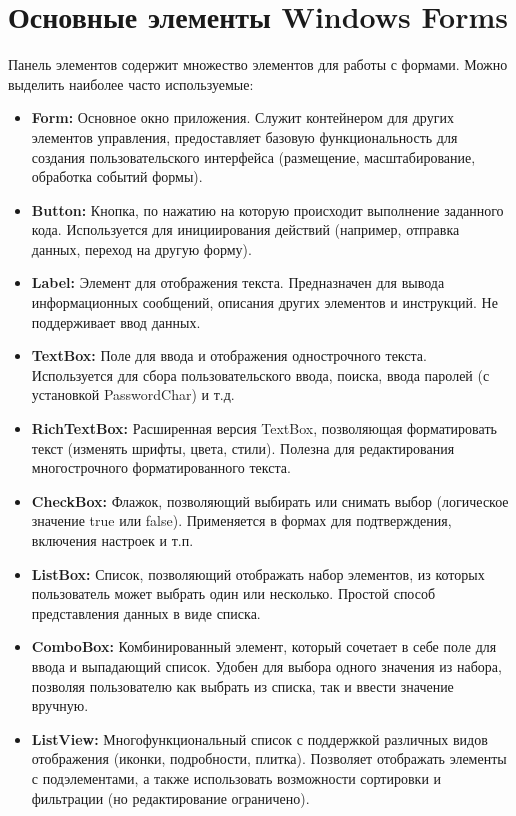 \documentclass[12pt]{article}
\renewcommand{\texttt}[1]{{\small\ttfamily #1}}
\numberwithin{listing}{section}
\numberwithin{figure}{section}
\begin{document}
\newpage

\section{Основные элементы Windows Forms}
Панель элементов содержит множество элементов для работы с формами.
Можно выделить наиболее часто используемые:
\begin{itemize}
	\item \textbf{\texttt{Form:}}
	      Основное окно приложения. Служит контейнером для других элементов управления, предоставляет базовую функциональность для создания пользовательского интерфейса (размещение, масштабирование, обработка событий формы).
	\item \textbf{\texttt{Button:}}
	      Кнопка, по нажатию на которую происходит выполнение заданного кода. Используется для инициирования действий (например, отправка данных, переход на другую форму).
	\item \textbf{\texttt{Label:}}
	      Элемент для отображения текста. Предназначен для вывода информационных сообщений, описания других элементов и инструкций. Не поддерживает ввод данных.
	\item \textbf{\texttt{TextBox:}}
	      Поле для ввода и отображения однострочного текста. Используется для сбора пользовательского ввода, поиска, ввода паролей (с установкой \texttt{PasswordChar}) и т.д.
	\item \textbf{\texttt{RichTextBox:}}
	      Расширенная версия TextBox, позволяющая форматировать текст (изменять шрифты, цвета, стили). Полезна для редактирования многострочного форматированного текста.
	\item \textbf{\texttt{CheckBox:}}
	      Флажок, позволяющий выбирать или снимать выбор (логическое значение \texttt{true} или \texttt{false}). Применяется в формах для подтверждения, включения настроек и т.п.
	\item \textbf{\texttt{ListBox:}}
	      Список, позволяющий отображать набор элементов, из которых пользователь может выбрать один или несколько. Простой способ представления данных в виде списка.
	\item \textbf{\texttt{ComboBox:}}
	      Комбинированный элемент, который сочетает в себе поле для ввода и выпадающий список. Удобен для выбора одного значения из набора, позволяя пользователю как выбрать из списка, так и ввести значение вручную.
	\item \textbf{\texttt{ListView:}}
	      Многофункциональный список с поддержкой различных видов отображения (иконки, подробности, плитка). Позволяет отображать элементы с подэлементами, а также использовать возможности сортировки и фильтрации (но редактирование ограничено).

\end{itemize}
\end{document}
